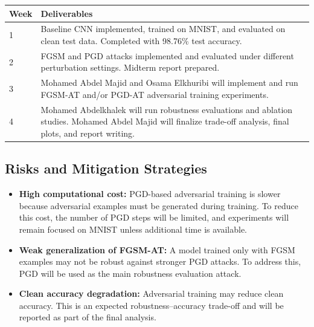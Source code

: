 \documentclass[conference,10pt]{IEEEtran}
\begin{document}
\begin{center}
\scriptsize
{}
\label{tab:timeline}
\renewcommand{\arraystretch}{1.15}
\begin{tabular}{p{} p{}}
\hline
\textbf{Week} & \textbf{Deliverables} \\
\hline
1 & Baseline CNN implemented, trained on MNIST, and evaluated on clean test data. Completed with 98.76\% test accuracy. \\
2 & FGSM and PGD attacks implemented and evaluated under different perturbation settings. Midterm report prepared. \\
3 & Mohamed Abdel Majid and Osama Elkhuribi will implement and run FGSM-AT and/or PGD-AT adversarial training experiments. \\
4 & Mohamed Abdelkhalek will run robustness evaluations and ablation studies. Mohamed Abdel Majid will finalize trade-off analysis, final plots, and report writing. \\
\hline
\end{tabular}
\end{center}
\vspace{-0.2cm}

\subsection{Risks and Mitigation Strategies}

\begin{itemize}
    \item \textbf{High computational cost:}
    PGD-based adversarial training is slower because adversarial examples must be generated during training. To reduce this cost, the number of PGD steps will be limited, and experiments will remain focused on MNIST unless additional time is available.

    \item \textbf{Weak generalization of FGSM-AT:}
    A model trained only with FGSM examples may not be robust against stronger PGD attacks. To address this, PGD will be used as the main robustness evaluation attack.

    \item \textbf{Clean accuracy degradation:}
    Adversarial training may reduce clean accuracy. This is an expected robustness--accuracy trade-off and will be reported as part of the final analysis.
\end{itemize}

\end{document}
